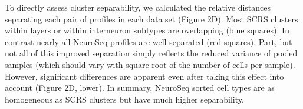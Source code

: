 To directly assess cluster separability, we calculated the relative distances separating each pair of profiles in each data set (Figure 2D). Most SCRS clusters within layers or within interneuron subtypes are overlapping (blue squares). In contrast nearly all NeuroSeq profiles are well separated (red squares). Part, but not all of this improved separation simply reflects the reduced variance of pooled samples (which should vary with square root of the number of cells per sample). However, significant differences are apparent even after taking this effect into account (Figure 2D, lower). In summary, NeuroSeq sorted cell types are as homogeneous as SCRS clusters but have much higher separability. 

